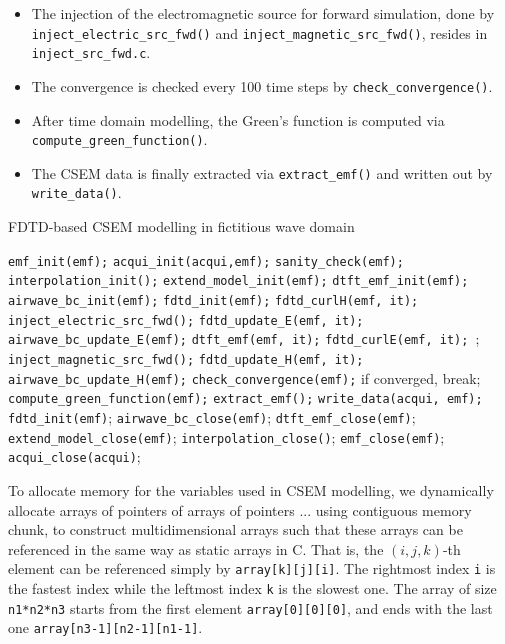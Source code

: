\documentclass[a4paper,10pt]{article}
\begin{document}
\begin{itemize}
\item The injection of the electromagnetic source for forward simulation, done by \verb|inject_electric_src_fwd()| and \verb|inject_magnetic_src_fwd()|, resides in \verb|inject_src_fwd.c|.

\item The convergence is checked every 100 time steps by \verb|check_convergence()|.

\item After time domain modelling, the Green's function is computed via \verb|compute_green_function()|.
  
\item The CSEM data is finally extracted via \verb|extract_emf()| and written out by \verb|write_data()|.
\end{itemize}

\begin{algorithm}[!tbh]
  \caption{FDTD-based CSEM modelling in fictitious wave domain}\label{alg:fdtd}
  \begin{algorithmic}[1]
  \State \verb|emf_init(emf);|\;
  \State \verb|acqui_init(acqui,emf);|\;
  \State \verb|sanity_check(emf);|\;
  \State \verb|interpolation_init();|\;
  \State \verb|extend_model_init(emf);|\;
  \State \verb|dtft_emf_init(emf);|\;
  \State \verb|airwave_bc_init(emf);|\;
  \State \verb|fdtd_init(emf);|\;
    \State \verb|fdtd_curlH(emf, it);|\;
    \State \verb|inject_electric_src_fwd();|\;
    \State \verb|fdtd_update_E(emf, it);|\;
    \State \verb|airwave_bc_update_E(emf);|\;
    \State \verb|dtft_emf(emf, it);|\;
    \State \verb|fdtd_curlE(emf, it); |;\;
    \State \verb|inject_magnetic_src_fwd();|\;
    \State \verb|fdtd_update_H(emf, it);|\;
    \State \verb|airwave_bc_update_H(emf);|\;
    \State  \verb|check_convergence(emf);|\;
    \State  if converged, break; \;
    \EndIf
    \EndFor
    \State \verb|compute_green_function(emf);|\;
    \State \verb|extract_emf();|\;
    \State \verb|write_data(acqui, emf);|\;
  \State \verb|fdtd_init(emf)|;\;
  \State \verb|airwave_bc_close(emf)|;
  \State \verb|dtft_emf_close(emf)|;\;
  \State \verb|extend_model_close(emf)|;\;
  \State \verb|interpolation_close()|;\;
  \State \verb|emf_close(emf)|;\;
  \State \verb|acqui_close(acqui)|;\;
  \end{algorithmic}
\end{algorithm}

To allocate memory for the variables used in CSEM modelling, we dynamically allocate arrays of pointers of arrays of pointers ... using contiguous memory chunk, to construct multidimensional arrays such that these arrays can be referenced in the same way as static arrays in C. That is, the $(i, j, k)$-th element can be referenced simply by \verb|array[k][j][i]|. The rightmost index \verb|i| is the fastest index while the leftmost index \verb|k| is the slowest one.  The array of size \verb|n1*n2*n3| starts from the first element \verb|array[0][0][0]|, and ends with the last one \verb|array[n3-1][n2-1][n1-1]|.
\end{document}
